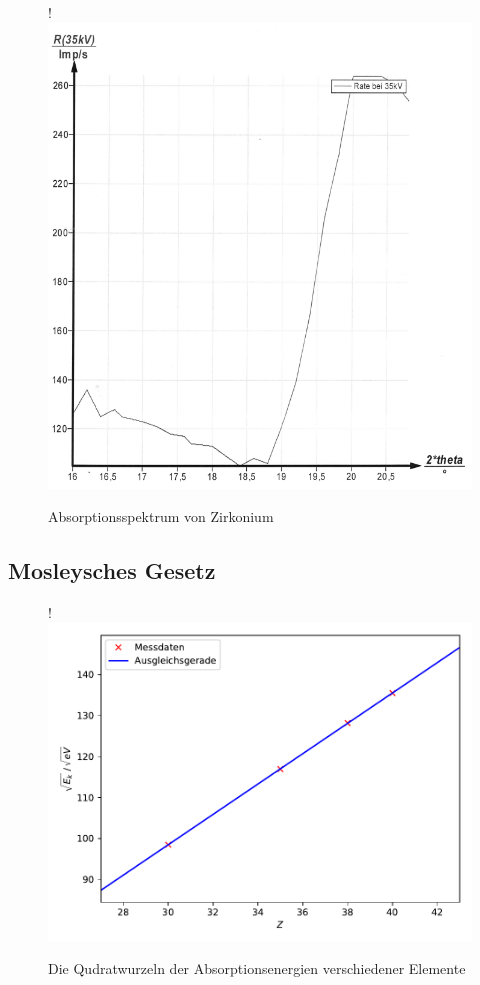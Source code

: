 \begin{figure}[H]!
  \centering
  \includegraphics[scale=0.3]{content/bild4.png}
  \caption{Absorptionsspektrum von Zirkonium}
  \label{fig:plot6}
\end{figure}

\subsection{Mosleysches Gesetz}

\begin{figure}[H]!
  \centering
  \includegraphics[scale=0.7]{content/plot1.pdf}
  \caption{Die Qudratwurzeln der Absorptionsenergien verschiedener Elemente}
  \label{fig:plotx}
\end{figure}


